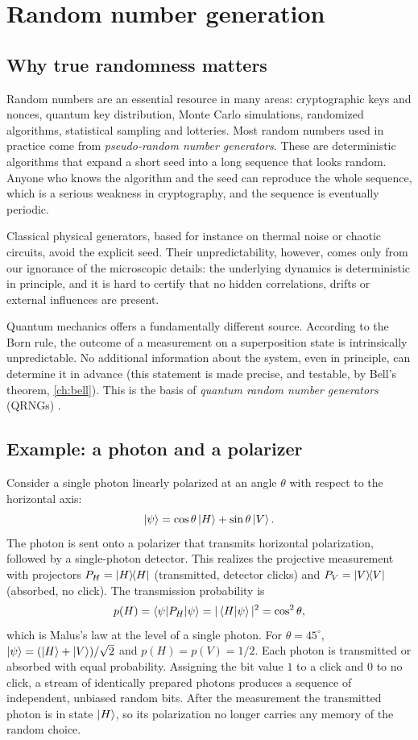 \section{Random number generation}
\subsection{Why true randomness matters}
Random numbers are an essential resource in many areas: cryptographic keys and nonces, quantum key distribution, Monte Carlo simulations,
randomized algorithms, statistical sampling and lotteries. Most random numbers used in practice come from \emph{pseudo-random number generators}.
These are deterministic algorithms that expand a short seed into a long sequence that looks random. Anyone who knows the algorithm and the
seed can reproduce the whole sequence, which is a serious weakness in cryptography, and the sequence is eventually periodic.

Classical physical generators, based for instance on thermal noise or chaotic circuits, avoid the explicit seed. Their unpredictability,
however, comes only from our ignorance of the microscopic details: the underlying dynamics is deterministic in principle, and it is hard to
certify that no hidden correlations, drifts or external influences are present.

Quantum mechanics offers a fundamentally different source. According to the Born rule, the outcome of a measurement on a superposition state
is intrinsically unpredictable. No additional information about the system, even in principle, can determine it in advance (this statement is
made precise, and testable, by Bell's theorem, \cref{ch:bell}). This is the basis of \emph{quantum random number generators} (QRNGs) \cite{Jacak2021}.

\subsection{Example: a photon and a polarizer}
Consider a single photon linearly polarized at an angle $\theta$ with respect to the horizontal axis:
\begin{equation}
  \left|\psi\right\rangle=\cos\theta\left|H\right\rangle+\sin\theta\left|V\right\rangle.
\end{equation}
The photon is sent onto a polarizer that transmits horizontal polarization, followed by a single-photon detector. This realizes the
projective measurement with projectors $P_H=\left|H\middle\rangle\!\middle\langle H\right|$ (transmitted, detector clicks) and $P_V=\left|V\middle\rangle\!\middle\langle V\right|$ (absorbed, no click). The transmission
probability is
\begin{equation}
  p(H)=\left\langle\psi\middle|P_H\middle|\psi\right\rangle=|\left\langle H\middle|\psi\right\rangle|^2=\cos^2\theta,
\end{equation}
which is Malus's law at the level of a single photon. For $\theta=45^\circ$, $\left|\psi\right\rangle=(\left|H\right\rangle+\left|V\right\rangle)/\sqrt2$ and $p(H)=p(V)=1/2$. Each photon is
transmitted or absorbed with equal probability. Assigning the bit value $1$ to a click and $0$ to no click, a stream of identically prepared
photons produces a sequence of independent, unbiased random bits. After the measurement the transmitted photon is in state $\left|H\right\rangle$, so its
polarization no longer carries any memory of the random choice.

